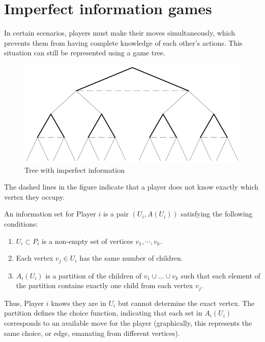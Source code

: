 \section{Imperfect information games}

In certain scenarios, players must make their moves simultaneously, which prevents them from having complete knowledge of each other's actions. 
This situation can still be represented using a game tree.
\begin{figure}[H]
    \centering
    \includegraphics[width=0.75\linewidth]{images/tree3.png}
    \caption{Tree with imperfect information}
\end{figure}
The dashed lines in the figure indicate that a player does not know exactly which vertex they occupy.
\begin{definition}
    An information set for Player $i$ is a pair $(U_i, A(U_i))$ satisfying the following conditions: 
    \begin{enumerate}
        \item $U_i \subset P_i$ is a non-empty set of vertices $v_1, \cdots, v_k$.
        \item Each vertex $v_j\in U_i$ has the same number of children.
        \item $A_i(U_i)$ is a partition of the children of $v_1 \cup \dots \cup v_k$ such that each element of the partition contains exactly one child from each vertex $v_j$.
    \end{enumerate}
\end{definition}
\noindent Thus, Player $i$ knows they are in $U_i$ but cannot determine the exact vertex.
The partition defines the choice function, indicating that each set in $A_i(U_i)$ corresponds to an available move for the player (graphically, this represents the same choice, or edge, emanating from different vertices).
